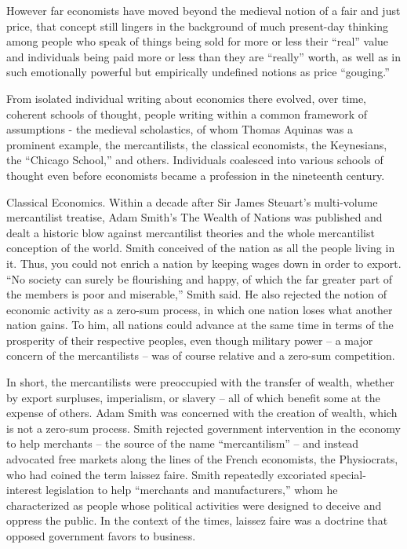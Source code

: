 However far economists have moved beyond the medieval notion of a fair and just price, that concept still lingers in the background of much present-day thinking among people who speak of things being sold for more or less their ``real'' value and individuals being paid more or less than they are ``really'' worth, as well as in such emotionally powerful but empirically undefined notions as price ``gouging.''

From isolated individual writing about economics there evolved, over time, coherent schools of thought, people writing within a common framework of assumptions - the medieval scholastics, of whom Thomas Aquinas was a prominent example, the mercantilists, the classical economists, the Keynesians, the ``Chicago School,'' and others. Individuals coalesced into various schools of thought even before economists became a profession in the nineteenth century.

Classical Economics. Within a decade after Sir James Steuart’s multi-volume mercantilist treatise, Adam Smith’s The Wealth of Nations was published and dealt a historic blow against mercantilist theories and the whole mercantilist conception of the world. Smith conceived of the nation as all the people living in it. Thus, you could not enrich a nation by keeping wages down in order to export. “No society can surely be flourishing and happy, of which the far greater part of the members is poor and miserable,” Smith said. He also rejected the notion of economic activity as a zero-sum process, in which one nation loses what another nation gains. To him, all nations could advance at the same time in terms of the prosperity of their respective peoples, even though military power – a major concern of the mercantilists – was of course relative and a zero-sum competition.

In short, the mercantilists were preoccupied with the transfer of wealth, whether by export surpluses, imperialism, or slavery – all of which benefit some at the expense of others. Adam Smith was concerned with the creation of wealth, which is not a zero-sum process. Smith rejected government intervention in the economy to help merchants – the source of the name ``mercantilism'' – and instead advocated free markets along the lines of the French economists, the Physiocrats, who had coined the term laissez faire. Smith repeatedly excoriated special-interest legislation to help ``merchants and manufacturers,'' whom he characterized as people whose political activities were designed to deceive and oppress the public. In the context of the times, laissez faire was a doctrine that opposed government favors to business.

